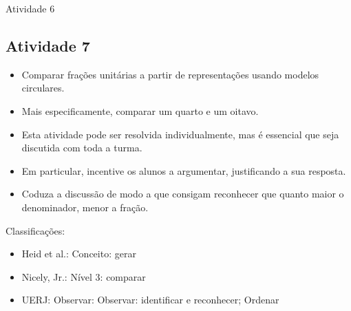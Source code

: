 \begin{multicols}{2}
\begin{resposta*}{Atividade 6}
\end{resposta*}

\subsection{Atividade 7}

  \vspace{.1cm}
  
\begin{itemize} %
    \item       Comparar frações unitárias a partir de representações usando modelos circulares.
    \item       Mais especificamente, comparar um quarto e um oitavo.
\end{itemize} %


  \vspace{.1cm} 
  
  \vspace{.1cm}
  
\begin{itemize} %
    \item       Esta atividade pode ser resolvida individualmente, mas é essencial que seja discutida com toda a turma.
    \item       Em particular, incentive os alunos a argumentar, justificando a sua resposta.
    \item       Coduza a discussão de modo a que consigam reconhecer que quanto maior o denominador, menor a fração.
\end{itemize} %


  Classificações:
\begin{itemize} %
    \item       Heid et al.: Conceito: gerar
    \item       Nicely, Jr.: Nível 3: comparar
    \item       UERJ: Observar: Observar: identificar e reconhecer; Ordenar
\end{itemize} %




\end{multicols}
